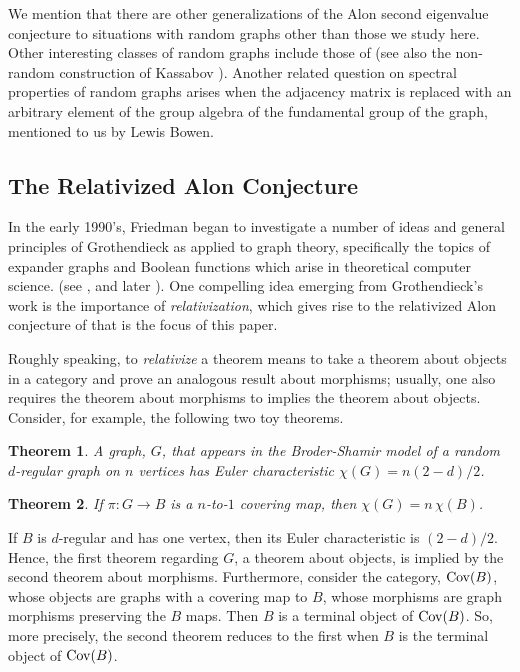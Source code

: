 \documentclass{memo-l}
\theoremstyle{plain}
\newtheorem{theorem}{Theorem}[section]
\theoremstyle{definition}
\numberwithin{section}{chapter}
\numberwithin{equation}{chapter}
\newcommand{\from}{\colon}
\theoremstyle{plain}
\theoremstyle{definition}
\begin{document}
We mention that
there are other generalizations of the Alon second eigenvalue
conjecture to situations
with random graphs other than those we study here.  
Other interesting classes of random graphs include
those of \cite{fjrst98}
(see also the non-random construction of Kassabov \cite{kassabov}).
Another related question on spectral properties
of random graphs arises when the adjacency matrix is replaced with an
arbitrary element of the group algebra of the fundamental group of the
graph, mentioned to us by Lewis Bowen.


\subsection{The Relativized Alon Conjecture}

In the early 1990's, Friedman began to investigate a number of
ideas and general principles of Grothendieck as applied to graph theory,
specifically the topics of expander graphs and Boolean functions which
arise in theoretical computer science.
(see \cite{friedman_geometric_aspects,friedman_relative_boolean},
and later \cite{friedman_relative,friedman_cohomology,
friedman_cohomology2,friedman_linear,friedman_sheaves,friedman_sheaves_hnc,
friedman_memoirs_hnc}).
One compelling idea emerging from Grothendieck's work is the
importance of 
{\em relativization}, which gives rise to the 
relativized Alon conjecture of \cite{friedman_relative}
that is the focus of this paper.

Roughly speaking, to {\em relativize} a theorem means to take a
theorem about objects in a category
and prove an analogous result about morphisms;
usually, one also requires the theorem about morphisms to
implies
the theorem about objects.  Consider,
for example, the following two toy theorems. 

\begin{theorem} A graph, $G$, that appears in the Broder-Shamir
model of a random $d$-regular graph on $n$ vertices
has Euler characteristic
$\chi(G)=n(2-d)/2$.
\end{theorem}

\begin{theorem} If $\pi\from G\to B$ is a $n$-to-$1$ covering map, 
then $\chi(G)=n\,\chi(B)$.
\end{theorem}

If $B$ is $d$-regular and has one vertex, then its Euler
characteristic is $(2-d)/2$.
Hence, the first theorem regarding $G$, a theorem about objects,
is implied by the second
theorem about morphisms.
Furthermore, consider the category, ${\rm Cov}(B)$,
whose objects are graphs with a covering map to
$B$, whose morphisms are graph morphisms preserving the $B$ maps.
Then $B$ is a terminal object of ${\rm Cov}(B)$.
So, more precisely, the second theorem reduces to the first when
$B$ is the terminal object of ${\rm Cov}(B)$.
\end{document}
